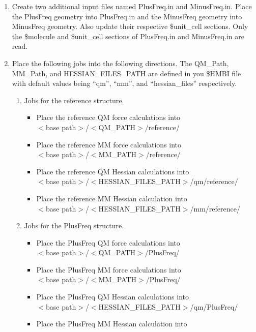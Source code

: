 \documentclass[11pt,letterpaper]{article}
\begin{document}
\begin{spacing}{1.0}
\begin{enumerate}
    \item Create two additional input files named PlusFreq.in and MinusFreq.in. Place the PlusFreq geometry into PlusFreq.in
      and the MinusFreq geometry into MinusFreq geometry. Also update their respective \$unit\_cell sections. Only the \$molecule and \$unit\_cell sections of PlusFreq.in and MinusFreq.in are
      read.
    \item Place the following jobs into the following directions. The QM\_Path, MM\_Path, and 
      HESSIAN\_FILES\_PATH are defined in you \$HMBI file with default values being ``qm'', ``mm'', and ``hessian\_files''
      respectively.
      \begin{enumerate}
        \item Jobs for the reference structure.
        \begin{itemize}
          \item Place the reference QM force calculations into \\
            $<$base path$>$/$<$QM\_PATH$>$/reference/ 
          \item Place the reference MM force calculations into \\
            $<$base path$>$/$<$MM\_PATH$>$/reference/   
          \item Place the reference QM Hessian calculations into \\
            $<$base path$>$/$<$HESSIAN\_FILES\_PATH$>$/qm/reference/  
          \item Place the reference MM Hessian calculation into \\
            $<$base path$>$/$<$HESSIAN\_FILES\_PATH$>$/mm/reference/  
        \end{itemize}
        \item Jobs for the PlusFreq structure.
        \begin{itemize}
          \item Place the PlusFreq QM force calculations into \\
            $<$base path$>$/$<$QM\_PATH$>$/PlusFreq/ 
          \item Place the PlusFreq MM force calculations into \\
            $<$base path$>$/$<$MM\_PATH$>$/PlusFreq/   
          \item Place the PlusFreq QM Hessian calculations into \\
            $<$base path$>$/$<$HESSIAN\_FILES\_PATH$>$/qm/PlusFreq/  
          \item Place the PlusFreq MM Hessian calculation into \\

\end{itemize}
\end{enumerate}
\end{enumerate}
\end{spacing}
\end{document}
